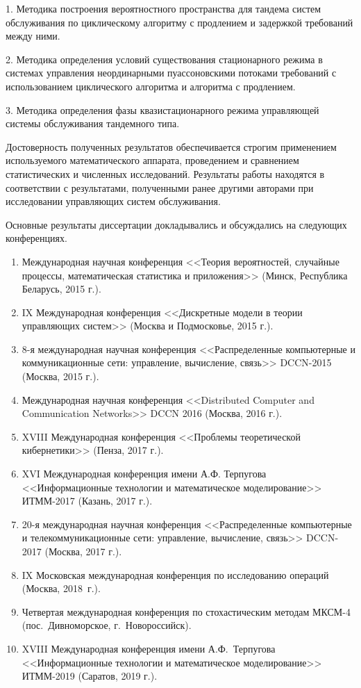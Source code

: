 \pagebreak
{}

1. Методика построения вероятностного пространства для тандема систем обслуживания по циклическому алгоритму с продлением и задержкой требований между ними.

2. Методика определения условий существования стационарного режима в системах управления неординарными пуассоновскими потоками требований с использованием циклического алгоритма и алгоритма с продлением.

3. Методика определения фазы квазистационарного режима  управляющей системы обслуживания тандемного типа.





{\probation} Достоверность полученных результатов обеспечивается строгим применением используемого математического аппарата, проведением и сравнением статистических и численных исследований. Результаты работы находятся в соответствии с результатами, полученными ранее другими авторами при исследовании управляющих систем обслуживания.

Основные результаты диссертации докладывались и обсуждались на следующих  конференциях.
\begin{enumerate}
    \item Международная научная конференция <<Теория вероятностей, случайные процессы, математическая статистика и приложения>> (Минск, Республика Беларусь, 2015 г.).
    \item IX Международная конференция <<Дискретные модели в теории управляющих систем>> (Москва и Подмосковье, 2015 г.).
\item 8-я международная научная конференция <<Распределенные компьютерные и коммуникационные сети: управление, вычисление, связь>> DCCN-2015 (Москва, 2015 г.).
\item Международная научная конференция <<Distributed Computer and Communication Networks>> DCCN 2016 (Москва, 2016 г.).
\item XVIII Международная конференция <<Проблемы теоретической кибернетики>> (Пенза, 2017 г.).
\item XVI Международная конференция имени А.Ф. Терпугова <<Информационные технологии и математическое моделирование>> ИТММ-2017 (Казань, 2017 г.).
\item  20-я международная научная конференция <<Распределенные компьютерные и телекоммуникационные сети: управление, вычисление, связь>> DCCN-2017 (Москва, 2017 г.).
\item IX Московская международная конференция по исследованию операций (Москва, 2018~г.).
\item Четвертая международная конференция по стохастическим методам МКСМ-4 (пос.~Дивноморское, г.~Новороссийск).
\item XVIII Международная конференция имени А.Ф.~Терпугова <<Информационные технологии и математическое моделирование>> ИТММ-2019 (Саратов, 2019 г.).
\end{enumerate}


